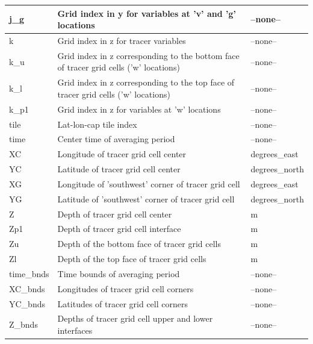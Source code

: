 \begin{longtable}{|m{}|m{}|m{}|}
j\_g &Grid index in y for variables at 'v' and 'g' locations &--none--  \\ \hline
k &Grid index in z for tracer variables &--none--  \\ \hline
k\_u &Grid index in z corresponding to the bottom face of tracer grid cells ('w' locations) &--none--  \\ \hline
k\_l &Grid index in z corresponding to the top face of tracer grid cells ('w' locations) &--none--  \\ \hline
k\_p1 &Grid index in z for variables at 'w' locations &--none--  \\ \hline
tile &Lat-lon-cap tile index &--none--  \\ \hline
time &Center time of averaging period &--none--  \\ \hline
XC &Longitude of tracer grid cell center &degrees\_east  \\ \hline
YC &Latitude of tracer grid cell center &degrees\_north  \\ \hline
XG &Longitude of 'southwest' corner of tracer grid cell &degrees\_east  \\ \hline
YG &Latitude of 'southwest' corner of tracer grid cell &degrees\_north  \\ \hline
Z &Depth of tracer grid cell center &m  \\ \hline
Zp1 &Depth of tracer grid cell interface &m  \\ \hline
Zu &Depth of the bottom face of tracer grid cells &m  \\ \hline
Zl &Depth of the top face of tracer grid cells &m  \\ \hline
time\_bnds &Time bounds of averaging period &--none--  \\ \hline
XC\_bnds &Longitudes of tracer grid cell corners &--none--  \\ \hline
YC\_bnds &Latitudes of tracer grid cell corners &--none--  \\ \hline
Z\_bnds &Depths of tracer grid cell upper and lower interfaces &--none--  \\ \hline
\end{longtable}

\newp
\pagebreak
